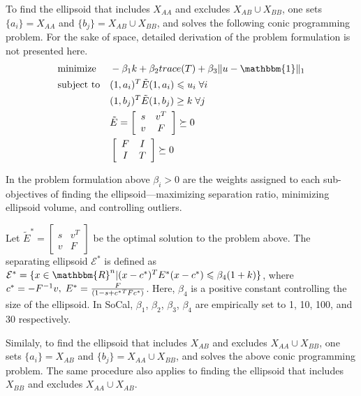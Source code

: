 \documentclass{scrartcl}
\begin{document}
\par
To find the ellipsoid that includes $X_{AA}$ and excludes
$X_{AB} \cup X_{BB}$, one
sets $\{a_i\}=X_{AA}$ and $\{b_j\}=X_{AB} \cup X_{BB}$, and
solves the following conic programming problem.
For the sake of space, detailed derivation of the problem formulation is not
presented here.
\begin{equation*}
\begin{aligned}
& \text{minimize}
&& -{\beta_{1}}k+{\beta_{2}} trace(T)+\beta_{3} \|u-\mathbbm{1}\|_1 \\  
& \text{subject to}
&& (1,a_i)^T\tilde{E}(1,a_i)\leqslant u_i \; \forall i \\
&&&(1,b_j)^T\tilde{E}(1,b_j) \ge k \; \forall j \\
&&&\tilde{E}=
    \left[
        \begin{array}{cc}
            s & v^T \\
            v & F
        \end{array}
    \right] \succeq 0 \\
&&&\left[
        \begin{array}{cc}
            F & I \\
            I & T
        \end{array}
    \right] \succeq 0
\end{aligned}
\end{equation*}

\par
In the problem formulation above $\beta_{i} > 0$ are the weights assigned to
each sub-objectives of finding the ellipsoid---maximizing separation ratio,
minimizing ellipsoid volume, and controlling outliers.

\par
Let 
$\tilde{E}^{*}=\left[
    \begin{array}{cc}
    s & v^T \\
    v & F
    \end{array}
\right]$
be the optimal solution to the problem above.
The separating ellipsoid $\mathcal{E}^{*}$ is defined as
$\mathcal{E}^{*}=
\{x \in \mathbbm{R}^{n}|(x-c^{*})^TE^{*}(x-c^{*})\leqslant\beta_4(1+k)\}$,
where $c^{*}=-F^{-1}v,\;E^{*}={{F} \over {(1-s+{c^{*}}^TF{c^{*}})}}$.
Here, $\beta_4$ is a positive constant controlling the size of the ellipsoid.
In SoCal, $\beta_1$, $\beta_2$, $\beta_3$, $\beta_4$ are empirically
set to 1, 10, 100, and 30 respectively.

\par
Similaly, to find the ellipsoid that includes $X_{AB}$ and excludes
$X_{AA} \cup X_{BB}$, one sets $\{a_i\}=X_{AB}$ and
$\{b_j\}=X_{AA} \cup X_{BB}$, and solves the above conic programming problem.
The same procedure also applies to finding the ellipsoid that includes $X_{BB}$
and excludes $X_{AA} \cup X_{AB}$.
\end{document}
